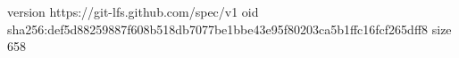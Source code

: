 version https://git-lfs.github.com/spec/v1
oid sha256:def5d88259887f608b518db7077be1bbe43e95f80203ca5b1ffc16fcf265dff8
size 658
